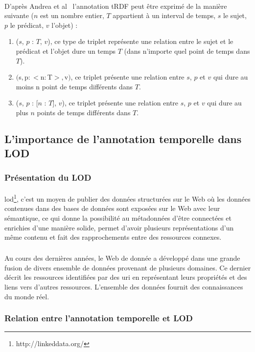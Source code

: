 \documentclass[12pt,a4	]{report}
\begin{document}
\paragraph{}
D'après Andrea et al~\cite{pugliese2008} l’annotation tRDF peut être exprimé de la manière suivante ($n$ est un nombre entier, $T$ appartient à un interval de temps, $s$ le sujet, $p$ le prédicat, $v$ l'objet) :
\begin{enumerate}
\item ($s$, $p$ : {$T$}, $v$), ce type de triplet représente une relation entre le sujet et le prédicat et l'objet dure un temps $T$ (dans n'importe quel point de temps dans $T$).
\item $($s$, $p$ : <$n$ : $T$>, $v$)$, ce triplet présente une relation entre $s$, $p$ et $v$ qui dure au moins n point de temps différents dans $T$.
\item ($s$, $p$ : [$n$ : $T$], $v$), ce triplet présente une relation entre $s$, $p$ et $v$ qui dure au plus $n$ points de temps différents dans $T$. 
\end{enumerate}
\subsection*{L'importance de l'annotation temporelle dans LOD}
\subsubsection*{Présentation du LOD}
\paragraph{}
\gls{lod}\footnote{http://linkeddata.org/}, c'est un moyen de publier des données structurées sur le Web où les données contenues dans des bases de données sont exposées sur le Web avec leur sémantique, ce qui donne la possibilité au métadonnées d'être connectées et enrichies d'une manière solide, permet d'avoir plusieurs représentations d'un même contenu et fait des rapprochements entre des ressources connexes. 
\subparagraph{}
Au cours des dernières années, le Web de donnée a développé dans une grande fusion de divers ensemble de données provenant de plusieurs domaines. Ce dernier décrit les ressources identifiées par des \gls{uri} en représentant leurs propriétés et des liens vers d’autres ressources. L'ensemble des données fournit des connaissances du monde réel.
\subsubsection*{Relation entre l'annotation temporelle et LOD}
\end{document}

